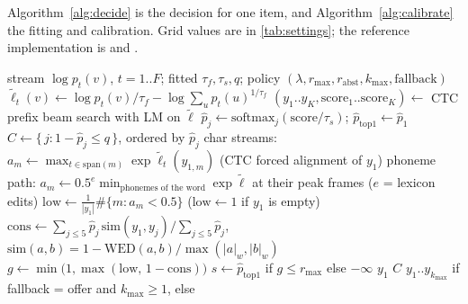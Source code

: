 Algorithm~\ref{alg:decide} is the decision for one item, and Algorithm~\ref{alg:calibrate} the fitting and calibration. Grid values are in \cref{tab:settings}; the reference implementation is  and .

\begin{algorithm}[H]
\caption{Trust decision for one item}
\label{alg:decide}
\small
\begin{algorithmic}[1]
\Require stream $\log p_t(v)$, $t = 1..F$; fitted $\tau_f, \tau_s, q$; policy $(\lambda, r_{\max}, r_{\mathrm{abst}}, k_{\max}, \text{fallback})$
\State $\tilde\ell_t(v) \gets \log p_t(v)/\tau_f - \log\sum_{u} p_t(u)^{1/\tau_f}$ 
\State $(y_1..y_K, \text{score}_1..\text{score}_K) \gets$ CTC prefix beam search with LM on $\tilde\ell$ 
\State $\hat p_j \gets \mathrm{softmax}_j(\text{score}/\tau_s)$; \quad $\hat p_{\mathrm{top1}} \gets \hat p_1$
\State $C \gets \{\, j : 1 - \hat p_j \le q \,\}$, ordered by $\hat p_j$ 
 
  \State char streams: $a_m \gets \max_{t \in \mathrm{span}(m)} \exp\tilde\ell_t(y_{1,m})$ (CTC forced alignment of $y_1$)
  \State phoneme path: $a_m \gets 0.5^{e}\min_{\text{phonemes of the word}} \exp\tilde\ell$ at their peak frames ($e$ = lexicon edits)
\EndFor
\State $\mathrm{low} \gets \frac{1}{|y_1|}\#\{m : a_m < 0.5\}$ \quad ($\mathrm{low} \gets 1$ if $y_1$ is empty)
\State $\mathrm{cons} \gets \sum_{j \le 5} \hat p_j\, \mathrm{sim}(y_1, y_j) / \sum_{j \le 5} \hat p_j$, \quad $\mathrm{sim}(a,b) = 1 - \mathrm{WED}(a,b)/\max(|a|_w, |b|_w)$
\State $g \gets \min\bigl(1, \max(\mathrm{low},\, 1 - \mathrm{cons})\bigr)$ 
 \Return {}
\EndIf
\State $s \gets \hat p_{\mathrm{top1}}$ if $g \le r_{\max}$ else $-\infty$ 
 \Return {} $y_1$
\EndIf
{} \Return {} $C$
\EndIf
\State \Return {} $y_1..y_{k_{\max}}$ if fallback = offer and $k_{\max} \ge 1$, else 
\end{algorithmic}
\end{algorithm}

